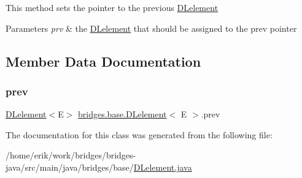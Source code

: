 This method sets the pointer to the previous \hyperlink{classbridges_1_1base_1_1_d_lelement}{D\+Lelement}


\begin{DoxyParams}{Parameters}
{\em prv} & the \hyperlink{classbridges_1_1base_1_1_d_lelement}{D\+Lelement} that should be assigned to the prev pointer \\
\hline
\end{DoxyParams}


\subsection{Member Data Documentation}
\mbox{\label{classbridges_1_1base_1_1_d_lelement_a6eba4876f820b75ac6bde01d7dea9da7}} 
\subsubsection{\texorpdfstring{prev}{prev}}
{\footnotesize\ttfamily \hyperlink{classbridges_1_1base_1_1_d_lelement}{D\+Lelement}$<$E$>$ \hyperlink{classbridges_1_1base_1_1_d_lelement}{bridges.\+base.\+D\+Lelement}$<$ E $>$.prev\hspace{0.3cm}{\ttfamily [protected]}}



The documentation for this class was generated from the following file\+:\begin{DoxyCompactItemize}
\item 
/home/erik/work/bridges/bridges-\/java/src/main/java/bridges/base/\hyperlink{_d_lelement_8java}{D\+Lelement.\+java}\end{DoxyCompactItemize}
